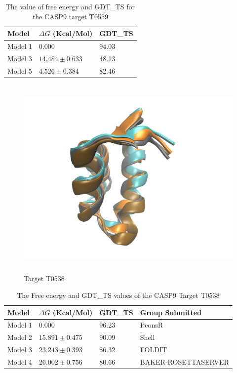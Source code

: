 \documentclass[12pt]{article}
\begin{document}
\begin{table}
\caption{The value of free energy and GDT\_TS for the CASP9 target T0559}
\label{tab:T0559}
\begin{center}
\begin{tabular}{l l l}\hline
Model   &     $\Delta G$ (Kcal/Mol) &  GDT\_TS \\ \hline
Model 1 &     0.000            &  94.03    \\
Model 3 &     $14.484 \pm 0.633$ &  48.13    \\
Model 5 &     $4.526  \pm 0.384$ &  82.46    \\ \hline
\end{tabular}
\end{center}
\end{table}

\begin{figure}
\begin{center}
\includegraphics[width=12cm,height=10cm]{T0538.pdf}
\end{center}
\caption{Target T0538}
\label{fig:T0538}
\end{figure}

\begin{table}
\caption{The Free energy and GDT\_TS values of the CASP9 Target T0538}
\label{tab:T0538}
\begin{center}
\begin{tabular}{l l l l}\hline
Model   &     $\Delta G$ (Kcal/Mol) &  GDT\_TS & Group Submitted \\ \hline
Model 1 &     0.000              &  96.23    & PconsR  \\
Model 2 &     $15.891 \pm 0.475$ &  90.09  & Shell  \\
Model 3 &     $23.243 \pm 0.393$ &  86.32  & FOLDIT  \\
Model 4 &     $26.002 \pm 0.756$ &  80.66  & BAKER-ROSETTASERVER \\ \hline
\end{tabular}
\end{center}
\end{table}
\end{document}
